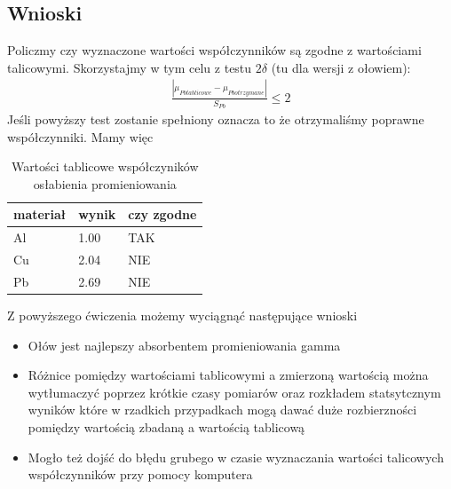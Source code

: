 \documentclass[a4paper]{article}
\newlength{\du}
\begin{document}
\subsection{Wnioski}
Policzmy czy wyznaczone wartości współczynników są zgodne z wartościami talicowymi. Skorzystajmy w tym celu z testu $2\delta$ (tu dla wersji z ołowiem):
\begin{align*}
\frac{|\mu_{Pb tablicowe} - \mu_{Pb otrzymane}|}{S_{Pb}} \leq 2
\end{align*}
Jeśli powyższy test zostanie spełniony oznacza to że otrzymaliśmy poprawne współczynniki.
Mamy więc
\begin{table}[h!]
\centering
\begin{tabular}{ | l | l | l | }
\hline
materiał & wynik & czy zgodne \\ \hline
Al & 1.00 & TAK \\ \hline  
Cu & 2.04 & NIE \\ \hline  
Pb & 2.69 & NIE \\ \hline  
\end{tabular}
\caption{Wartości tablicowe współczyników osłabienia promieniowania}
\label{pomiary_sruba}
\end{table}
Z powyższego ćwiczenia możemy wyciągnąć następujące wnioski
\begin{itemize}
\item Ołów jest najlepszy absorbentem promieniowania gamma
\item Różnice pomiędzy wartościami tablicowymi a zmierzoną wartością można wytłumaczyć poprzez krótkie czasy pomiarów oraz rozkładem statsytcznym wyników które w rzadkich przypadkach mogą dawać duże rozbierzności pomiędzy wartością zbadaną a wartością tablicową
\item Mogło też dojść do błędu grubego w czasie wyznaczania wartości talicowych współczynników przy pomocy komputera
\end{itemize}
\end{document}
